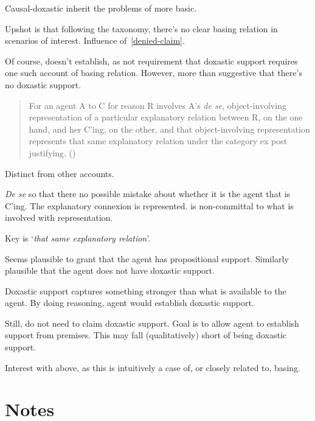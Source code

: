 \begin{note}[Doxastic]
  Causal-doxastic inherit the problems of more basic.

  Upshot is that following the taxonomy, there's no clear basing relation in scenarios of interest.
  Influence of~\ref{denied-claim}.

  Of course, doesn't establish, as not requirement that doxastic support requires one such account of basing relation.
  However, more than suggestive that there's no doxastic support.

  
\end{note}

\begin{note}
    \begin{quote}
    For an agent A to C for reason R involves A’s \emph{de se}, object-involving representation of a particular explanatory relation between R, on the one hand, and her C’ing, on the other, and that object-involving representation represents that same explanatory relation under the category ex post justifying.\nolinebreak
    \mbox{}\hfill\mbox{(\citeyear[204]{Neta:2019aa})}
  \end{quote}
  Distinct from other accounts.

  \emph{De se} so that there no possible mistake about whether it is the agent that is C'ing.
  The explanatory connexion is represented.
  \citeauthor{Neta:2019aa} is non-committal to what is involved with representation.

  Key is `\emph{that same explanatory relation}'.
\end{note}

\begin{note}[Summarising]
  Seems plausible to grant that the agent has propositional support.
  Similarly plausible that the agent does not have doxastic support.

  Doxastic support captures something stronger than what is available to the agent.
  By doing reasoning, agent would establish doxastic support.

  Still, do not need to claim doxastic support.
  Goal is to allow agent to establish support from premises.
  This may fall (qualitatively) short of being doxastic support.

  Interest with above, as this is intuitively a case of, or closely related to, basing.
\end{note}


\section{Notes}
\label{sec:notes}

